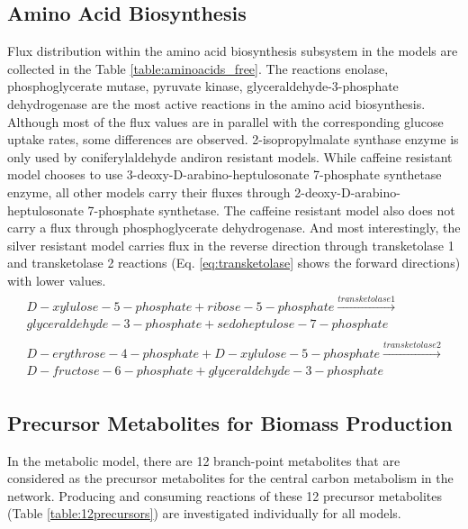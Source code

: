 \subsection{Amino Acid Biosynthesis}
Flux distribution within the amino acid biosynthesis subsystem in the models are collected in the Table \ref{table:aminoacids_free}. The reactions enolase, phosphoglycerate mutase, pyruvate kinase, glyceraldehyde-3-phosphate dehydrogenase are the most active reactions in the amino acid biosynthesis. Although most of the flux values are in parallel with the corresponding glucose uptake rates, some differences are observed. 2-isopropylmalate synthase enzyme is only used by coniferylaldehyde andiron resistant models. While caffeine resistant model chooses to use 3-deoxy-D-arabino-heptulosonate 7-phosphate synthetase enzyme, all other models carry their fluxes through 2-deoxy-D-arabino-heptulosonate 7-phosphate synthetase. The caffeine resistant model also does not carry a flux through phosphoglycerate dehydrogenase. And most interestingly, the silver resistant model carries flux in the reverse direction through transketolase 1 and transketolase 2 reactions (Eq. \ref{eq:transketolase} shows the forward directions) with lower values.
\begin{align}
\begin{split}
\label{eq:transketolase}
\ D-xylulose-5-phosphate + ribose-5-phosphate \xrightarrow{transketolase1} \\
\ glyceraldehyde-3-phosphate + sedoheptulose-7-phosphate \\
\ \\
\ D-erythrose-4-phosphate + D-xylulose-5-phosphate \xrightarrow{transketolase2} \\
\ D-fructose-6-phosphate + glyceraldehyde-3-phosphate
\end{split}
\end{align}

\baselineskip


\subsection{Precursor Metabolites for Biomass Production}
In the metabolic model, there are 12 branch-point metabolites that are considered as the precursor metabolites for the central carbon metabolism in the network. Producing and consuming reactions of these 12 precursor metabolites (Table \ref{table:12precursors}) are investigated individually for all models.

